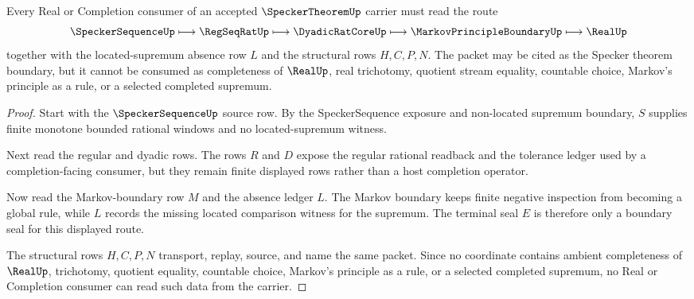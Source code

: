 \begin{theorem}
\label{thm:specker-theorem-real-completion-boundary}
Every Real or Completion consumer of an accepted $\SpeckerTheoremUp$ carrier must read the route
$$
\SpeckerSequenceUp \longmapsto \RegSeqRatUp \longmapsto \DyadicRatCoreUp \longmapsto \MarkovPrincipleBoundaryUp \longmapsto \RealUp
$$
together with the located-supremum absence row $L$ and the structural rows $H,C,P,N$. The packet may be cited as the Specker theorem boundary, but it cannot be consumed as completeness of $\RealUp$, real trichotomy, quotient stream equality, countable choice, Markov's principle as a rule, or a selected completed supremum.
\end{theorem}
\begin{proof}
Start with the $\SpeckerSequenceUp$ source row. By the SpeckerSequence exposure and non-located supremum boundary, $S$ supplies finite monotone bounded rational windows and no located-supremum witness.

Next read the regular and dyadic rows. The rows $R$ and $D$ expose the regular rational readback and the tolerance ledger used by a completion-facing consumer, but they remain finite displayed rows rather than a host completion operator.

Now read the Markov-boundary row $M$ and the absence ledger $L$. The Markov boundary keeps finite negative inspection from becoming a global rule, while $L$ records the missing located comparison witness for the supremum. The terminal seal $E$ is therefore only a boundary seal for this displayed route.

The structural rows $H,C,P,N$ transport, replay, source, and name the same packet. Since no coordinate contains ambient completeness of $\RealUp$, trichotomy, quotient equality, countable choice, Markov's principle as a rule, or a selected completed supremum, no Real or Completion consumer can read such data from the carrier.
\end{proof}



